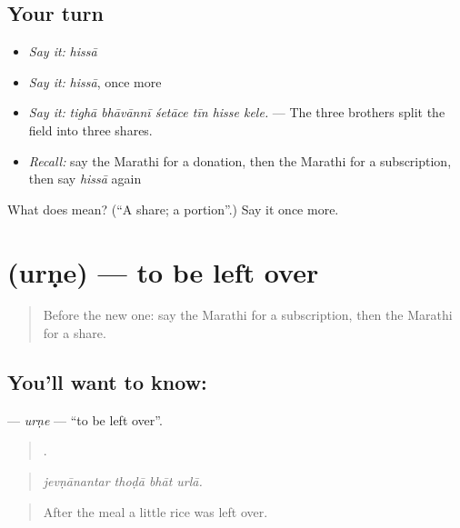 \subsection*{Your turn}
\begin{itemize}
\raggedright
  \item \emph{Say it:} \emph{hissā}
  \item \emph{Say it:} \emph{hissā}, once more
  \item \emph{Say it:} \emph{tighā bhāvānnī śetāce tīn hisse kele.} — The three brothers split the field into three shares.
  \item \emph{Recall:} say the Marathi for a donation, then the Marathi for a subscription, then say \emph{hissā} again
\end{itemize}

\begin{tcolorbox}[breakable,colback=teal!4,colframe=teal!35!black,title={Before you move on}]
What does  mean? (\textquotedblleft{}A share; a portion\textquotedblright{}.) Say it once more.
\end{tcolorbox}
\section[\texorpdfstring{\mr{उरणे} (urṇe)}{उरणे (urṇe)}]{ (urṇe) — to be left over}

\label{lesson:MR-C430-urne}



\begin{quote}
Before the new one: say the Marathi for a subscription, then the Marathi for a share.
\end{quote}

\subsection*{You'll want to know: }
\textbf{} — \emph{urṇe} — \textquotedblleft{}to be left over\textquotedblright{}.

\begin{quote}
   .
\end{quote}

\begin{quote}
\emph{jevṇānantar thoḍā bhāt urlā.}
\end{quote}

\begin{quote}
After the meal a little rice was left over.
\end{quote}

